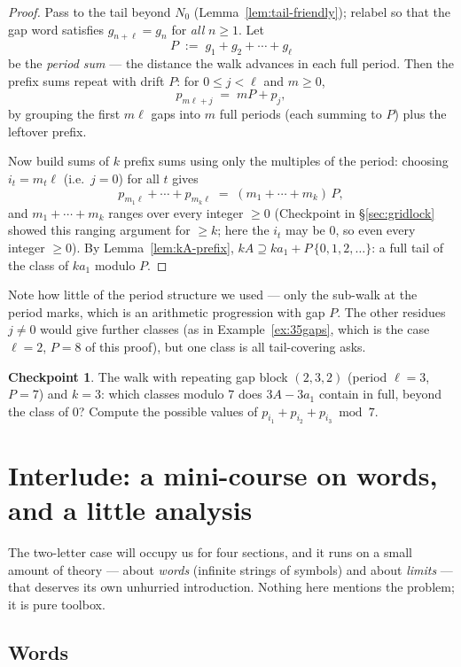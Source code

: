 \documentclass[11pt,reqno]{amsart}
\theoremstyle{plain}
\theoremstyle{definition}
\newtheorem{checkpoint}[theorem]{Checkpoint}   %
\theoremstyle{remark}
\begin{document}
\begin{proof}
Pass to the tail beyond $N_0$ (Lemma~\ref{lem:tail-friendly}); relabel so that the
gap word satisfies $g_{n+\ell} = g_n$ for \emph{all} $n \ge 1$. Let
\[
  P \;:=\; g_1 + g_2 + \cdots + g_\ell
\]
be the \emph{period sum} --- the distance the walk advances in each full period.
Then the prefix sums repeat with drift $P$: for $0 \le j < \ell$ and $m \ge 0$,
\[
  p_{m\ell + j} \;=\; mP + p_j ,
\]
by grouping the first $m\ell$ gaps into $m$ full periods (each summing to $P$) plus
the leftover prefix.

Now build sums of $k$ prefix sums using only the multiples of the period: choosing
$i_t = m_t \ell$ (i.e.\ $j = 0$) for all $t$ gives
\[
  p_{m_1 \ell} + \cdots + p_{m_k \ell} \;=\; (m_1 + \cdots + m_k)\, P ,
\]
and $m_1 + \cdots + m_k$ ranges over every integer $\ge 0$ (Checkpoint in
\S\ref{sec:gridlock} showed this ranging argument for $\ge k$; here the $i_t$ may be
$0$, so even every integer $\ge 0$). By Lemma~\ref{lem:kA-prefix}, $kA \supseteq
k a_1 + P\,\{0, 1, 2, \dots\}$: a full tail of the class of $k a_1$ modulo $P$.
\end{proof}

Note how little of the period structure we used --- only the sub-walk at the period
marks, which is an arithmetic progression with gap $P$. The other residues $j \ne 0$
would give further classes (as in Example~\ref{ex:35gaps}, which is the case $\ell =
2$, $P = 8$ of this proof), but one class is all tail-covering asks.

\begin{checkpoint}
The walk with repeating gap block $(2, 3, 2)$ (period $\ell = 3$, $P = 7$) and
$k = 3$: which classes modulo $7$ does $3A - 3a_1$ contain in full, beyond the class
of $0$? Compute the possible values of $p_{i_1} + p_{i_2} + p_{i_3} \bmod 7$.
\end{checkpoint}

\section{Interlude: a mini-course on words, and a little analysis}\label{sec:words}

The two-letter case will occupy us for four sections, and it runs on a small amount
of theory --- about \emph{words} (infinite strings of symbols) and about
\emph{limits} --- that deserves its own unhurried introduction. Nothing here mentions
the problem; it is pure toolbox.

\subsection{Words}
\end{document}
